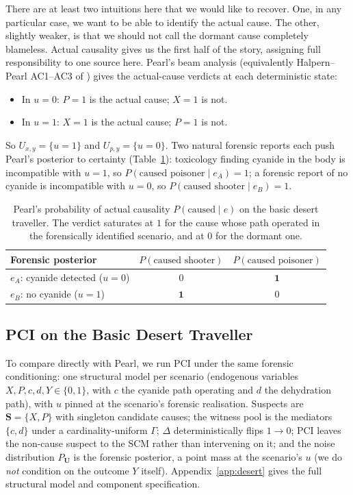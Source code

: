 There are at least two intuitions here that we would like to recover. One, in any particular case, we want
to be able to identify the actual cause. The other, slightly weaker, is that we should not call
the dormant cause completely blameless. Actual causality gives us the first half of the 
story, assigning full responsibility to one source here. Pearl's beam analysis \citep[Ch.~10]{causalityPearl} (equivalently
Halpern--Pearl AC1--AC3 of \citealp{actualCausalityHalpern}) gives the
actual-cause verdicts at each deterministic state:
\begin{itemize}
    \item In $u=0$: $P{=}1$ is the actual cause; $X{=}1$ is not.
    \item In $u=1$: $X{=}1$ is the actual cause; $P{=}1$ is not.
\end{itemize}
So $U_{x,y} = \{u=1\}$ and $U_{p,y} = \{u=0\}$. Two natural forensic reports
each push Pearl's posterior to certainty (Table~\ref{tab:pearl-pac-basic}):
toxicology finding cyanide in the body is incompatible with $u=1$, so
$P(\text{caused poisoner}\mid e_A) = 1$; a forensic report of no cyanide is
incompatible with $u=0$, so $P(\text{caused shooter}\mid e_B) = 1$.

\begin{table}[ht]
\centering
\begin{tabular}{lcc}
\toprule
Forensic posterior        & $P(\text{caused shooter})$ & $P(\text{caused poisoner})$ \\
\midrule
$e_A$: cyanide detected ($u=0$)  & $0$ & $\mathbf{1}$ \\
$e_B$: no cyanide ($u=1$)         & $\mathbf{1}$ & $0$ \\
\bottomrule
\end{tabular}
\caption{Pearl's probability of actual causality
$P(\text{caused}\mid e)$ on the basic desert traveller. The verdict saturates
at $1$ for the cause whose path operated in the forensically identified
scenario, and at $0$ for the dormant one.}
\label{tab:pearl-pac-basic}
\end{table}

\subsection{PCI on the Basic Desert Traveller}
\label{sub:pci-basic-dt}

To compare directly with Pearl, we run PCI under the same forensic
conditioning: one structural model per scenario (endogenous variables
$X, P, c, d, Y \in \{0,1\}$, with $c$ the cyanide path operating and $d$ the
dehydration path), with $u$ pinned at the scenario's forensic realisation.
Suspects are $\mathbf{S} = \{X, P\}$ with singleton candidate causes; the
witness pool is the mediators $\{c, d\}$ under a cardinality-uniform $\Gamma$;
$\Delta$ deterministically flips $1 \to 0$; PCI leaves the non-cause suspect
to the SCM rather than intervening on it; and the noise distribution
$P_{\mathbf{U}}$ is the forensic posterior, a point mass at the scenario's
$u$ (we do \emph{not} condition on the outcome $Y$ itself). Appendix~\ref{app:desert}
gives the full structural model and component specification.

